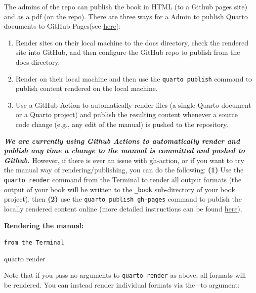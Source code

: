 \documentclass[
  letterpaper,
  DIV=11,
  numbers=noendperiod]{scrreprt}
\newenvironment{Shaded}{\begin{snugshade}}{\end{snugshade}}
\newcommand{\NormalTok}[1]{\textcolor[rgb]{0.00,0.23,0.31}{#1}}
\begin{document}
The admins of the repo can publish the book in HTML (to a Github pages
site) and as a pdf (on the repo). There are three ways for a Admin to
publish Quarto documents to GitHub Pages(see
\href{https://quarto.org/docs/publishing/github-pages.html}{here}):

\begin{enumerate}
\def\labelenumi{\arabic{enumi}.}
\item
  Render sites on their local machine to the docs directory, check the
  rendered site into GitHub, and then configure the GitHub repo to
  publish from the docs directory.
\item
  Render on their local machine and then use the
  \texttt{quarto\ publish} command to publish content rendered on the
  local machine.
\item
  Use a GitHub Action to automatically render files (a single Quarto
  document or a Quarto project) and publish the resulting content
  whenever a source code change (e.g., any edit of the manual) is pushed
  to the repository.
\end{enumerate}

\textbf{\emph{We are currently using Github Actions to automatically
render and publish any time a change to the manual is committed and
pushed to Github.}} However, if there is ever an issue with gh-action,
or if you want to try the manual way of rendering/publishing, you can do
the following: \textbf{(1)} Use the \texttt{quarto\ render} command from
the Terminal to render all output formats (the output of your book will
be written to the \texttt{\_book} sub-directory of your book project),
then \textbf{(2)} use the \texttt{quarto\ publish\ gh-pages} command to
publish the locally rendered content online (more detailed instructions
can be found \href{https://quarto.org/docs/books/}{here}).

\textbf{Rendering the manual:}

\begin{codelisting}

\caption{\texttt{from the Terminal}}

\begin{Shaded}
\begin{Highlighting}[]
\NormalTok{quarto render}
\end{Highlighting}
\end{Shaded}

\end{codelisting}

Note that if you pass no arguments to \texttt{quarto\ render} as above,
all formats will be rendered. You can instead render individual formats
via the --to argument:
\end{document}
